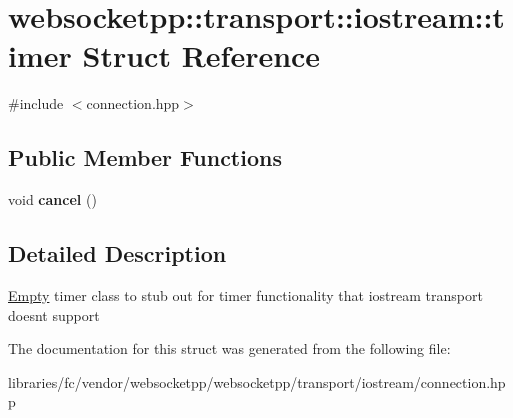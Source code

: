 \hypertarget{structwebsocketpp_1_1transport_1_1iostream_1_1timer}{}\section{websocketpp\+:\+:transport\+:\+:iostream\+:\+:timer Struct Reference}
\label{structwebsocketpp_1_1transport_1_1iostream_1_1timer}


{\ttfamily \#include $<$connection.\+hpp$>$}

\subsection*{Public Member Functions}
\begin{DoxyCompactItemize}
\item 
\mbox{\label{structwebsocketpp_1_1transport_1_1iostream_1_1timer_a5aca0296aba0bb6b6336b58c24053ec9}} 
void {\bfseries cancel} ()
\end{DoxyCompactItemize}


\subsection{Detailed Description}
\mbox{\hyperlink{class_empty}{Empty}} timer class to stub out for timer functionality that iostream transport doesn\textquotesingle{}t support 

The documentation for this struct was generated from the following file\+:\begin{DoxyCompactItemize}
\item 
libraries/fc/vendor/websocketpp/websocketpp/transport/iostream/connection.\+hpp\end{DoxyCompactItemize}

